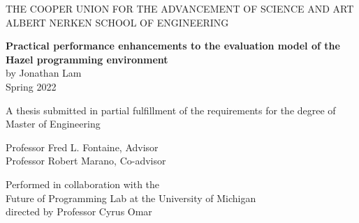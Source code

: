 \thispagestyle{empty}

{
  \centering

  \MakeUppercase{
    The Cooper Union for the Advancement of Science and Art \\
    Albert Nerken School of Engineering \\
  }
  
  \vfill{}
  
  {
    \textbf{
      \Large
      Practical performance enhancements to the evaluation model of the Hazel programming environment \\
    }
    \vs{}
    by Jonathan Lam \\
    Spring 2022 \\
  }

  \vfill{}

  {
    A thesis submitted in partial fulfillment of the requirements for the degree of \\
    Master of Engineering \\
  }

  \vfill{}

  {
    Professor Fred L. Fontaine, Advisor \\
    Professor Robert Marano, Co-advisor \\
  }


  \vfill{}
  {
    Performed in collaboration with the \\
    Future of Programming Lab at the University of Michigan \\
    directed by Professor Cyrus Omar \\
  }
}

